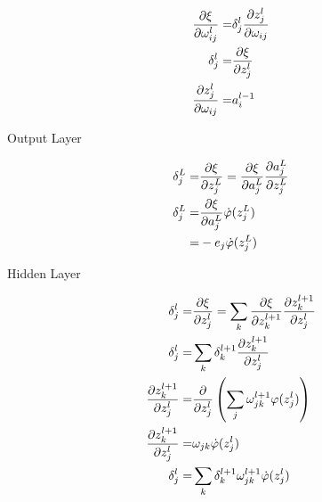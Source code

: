 \documentclass{rbt-mathnotes-formula-sheet}
\begin{document}
\begin{eqnarray}
    \pdv{\xi}{\omega^l_{ij}} = & \delta_j^l \pdv{z_j^l}{\omega_{ij}} \\
    \delta_j^l = & \pdv{\xi}{z_j^l} \\ 
    \pdv{z_j^l}{\omega_{ij}} = & a_i^{l-1} \\ 
\end{eqnarray}

Output Layer

\begin{eqnarray}
    \delta_j^L =& \pdv{\xi}{z_j^L} = \pdv{\xi}{a_j^L} \pdv{a_j^L}{z_j^L}\\
    \delta_j^L =& \pdv{\xi}{a_j^L} \dot{\varphi}(z_j^L)\\
               =& - e_j \dot{\varphi}(z_j^L)
\end{eqnarray}

Hidden Layer

\begin{eqnarray}
    \delta_j^l = & \pdv{\xi}{z_j^l} = \sum_k \pdv{\xi}{z_k^{l+1}} \pdv{z_k^{l+1}}{z_j^l}\\ 
    \delta_j^l = & \sum_k \delta_k^{l+1} \pdv{z_k^{l+1}}{z_j^l}\\
    \pdv{z_k^{l+1}}{z_j^l} = &
    \frac{\partial}{\partial z_j^l} \left( \sum_j \omega_{jk}^{l+1} \varphi(z_j^l) \right)\\
    \pdv{z_k^{l+1}}{z_j^l} = & \omega_{jk} \dot{\varphi}(z_j^l)\\
    \delta_j^l = & \sum_k \delta_k^{l+1} \omega_{jk}^{l+1} \dot{\varphi}(z_j^l)\\
\end{eqnarray}
\end{document}
